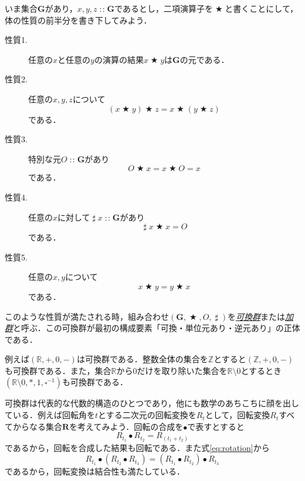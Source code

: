 \documentclass[a5paper,draft]{jsbook}
\newcommand{\keyword}[1]{{\underline{\emph{#1}}}}
\newcommand{\mathSet}[1]{\mathbf{#1}} %
\newcommand{\mathSpecialSet}[1]{\mathbb{#1}} %
\newcommand{\mathSomething}{\square}
\newcommand{\mathUnaryOperator}[1]{\operatorname{#1}}
\newcommand{\mathInverse}{\mathUnaryOperator{\sharp}}
\newcommand{\mathBinaryOperator}[1]{\operatorname{#1}}
\newcommand{\mathAnyBinaryOperator}{\mathBinaryOperator{\bigstar}}
\newcommand{\mathIn}{\mathBinaryOperator{:\!:}}
\newcommand{\mathGroup}[4]{(#1,#2,#3,#4)}
\begin{document}
いま集合$\mathSet{G}$があり，$x,y,z\mathIn\mathSet{G}$であるとし，二項演算子を$\mathAnyBinaryOperator$と書くことにして，体の性質の前半分を書き下してみよう．
\begin{description}
\item[性質1.] 任意の$x$と任意の$y$の演算の結果$x\mathAnyBinaryOperator y$は$\mathSet{G}$の元である．
\item[性質2.] 任意の$x,y,z$について
\begin{equation}
(x\mathAnyBinaryOperator y)\mathAnyBinaryOperator z=x\mathAnyBinaryOperator(y\mathAnyBinaryOperator z)
\end{equation}
である．
\item[性質3.] 特別な元$O\mathIn\mathSet{G}$があり
\begin{equation}
O\mathAnyBinaryOperator x=x\mathAnyBinaryOperator O=x
\end{equation}
である．
\item[性質4.] 任意の$x$に対して$\mathInverse x\mathIn\mathSet{G}$があり
\begin{equation}
\mathInverse x\mathAnyBinaryOperator x=O
\end{equation}
である．
\item[性質5.] 任意の$x,y$について
\begin{equation}
x\mathAnyBinaryOperator y=y\mathAnyBinaryOperator x
\end{equation}
である．
\end{description}
このような性質が満たされる時，組み合わせ$\mathGroup{\mathSet{G}}{\mathAnyBinaryOperator}{O}{\mathInverse}$を\keyword{可換群}または\keyword{加群}と呼ぶ．この可換群が最初の構成要素「可換・単位元あり・逆元あり」の正体である．

例えば$\mathGroup{\mathSpecialSet{R}}{+}{0}{-}$は可換群である．整数全体の集合を$\mathSpecialSet{Z}$とすると$\mathGroup{\mathSpecialSet{Z}}{+}{0}{-}$も可換群である．また，集合$\mathSpecialSet{R}$から$0$だけを取り除いた集合を$\mathSpecialSet{R}\setminus0$とするとき$\mathGroup{\mathSpecialSet{R}\setminus0}{*}{1}{\mathSomething^{-1}}$も可換群である．

可換群は代表的な代数的構造のひとつであり，他にも数学のあちこちに顔を出している．例えば回転角を$t$とする二次元の回転変換を$R_t$として，回転変換$R_t$すべてからなる集合$\mathSet{R}$を考えてみよう．回転の合成を$\bullet$で表すとすると
\begin{equation}
\label{eq:rotation}
R_{t_1}\bullet R_{t_2}=R_{(t_1+t_2)}
\end{equation}
であるから，回転を合成した結果も回転である．また式\eqref{eq:rotation}から
\begin{equation}
R_{t_1}\bullet\left(R_{t_2}\bullet R_{t_3}\right)=\left(R_{t_1}\bullet R_{t_2}\right)\bullet R_{t_3}
\end{equation}
であるから，回転変換は結合性も満たしている．
\end{document}
